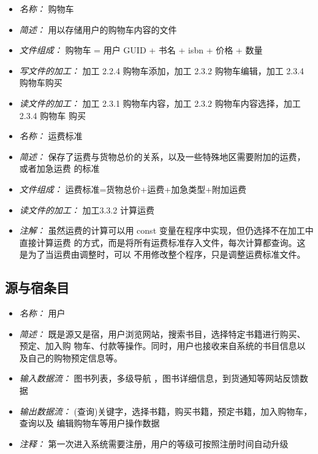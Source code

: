 \vspace{-1mm}


\begin{itemize}
\item \textit{名称： }购物车
\item \textit{简述： }用以存储用户的购物车内容的文件
\item \textit{文件组成： }购物车 = 用户 GUID + 书名 + isbn + 价格 + 数量
\item \textit{写文件的加工： }加工 2.2.4 购物车添加，加工 2.3.2 购物车编辑，加工 2.3.4 购物车购买 
\item \textit{读文件的加工： }加工 2.3.1 购物车内容，加工 2.3.2 购物车内容选择，加工 2.3.4 购物车 购买

\end{itemize}


\vspace{-1mm}


\begin{itemize}
\item \textit{名称： }运费标准 
\item \textit{简述： }保存了运费与货物总价的关系，以及一些特殊地区需要附加的运费，或者加急运费 的标准
\item \textit{文件组成： }运费标准={货物总价+运费}+{加急类型+附加运费}
\item \textit{读文件的加工： }加工3.3.2 计算运费
\item \textit{注解： }虽然运费的计算可以用 const 变量在程序中实现，但仍选择不在加工中直接计算运费 的方式，而是将所有运费标准存入文件，每次计算都查询。这是为了当运费由调整时，可以 不用修改整个程序，只是调整运费标准文件。

\end{itemize}


\vspace{-1mm}

\subsection{源与宿条目}
\begin{itemize}
\item \textit{名称： } 用户
\item \textit{简述： } 既是源又是宿，用户浏览网站，搜索书目，选择特定书籍进行购买、预定、加入购 物车、付款等操作。同时，用户也接收来自系统的书目信息以及自己的购物预定信息等。 
\item \textit{输入数据流： }图书列表，多级导航 ，图书详细信息，到货通知等网站反馈数据 
\item \textit{输出数据流： } (查询)关键字，选择书籍，购买书籍，预定书籍，加入购物车，查询以及 编辑购物车等用户操作数据
\item \textit{注释： } 第一次进入系统需要注册，用户的等级可按照注册时间自动升级

\end{itemize}


